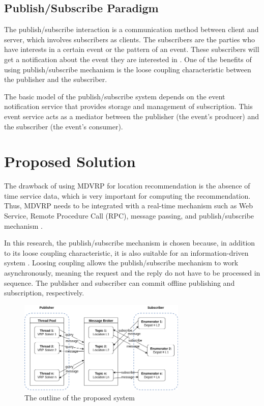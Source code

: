 \documentclass[conference]{IEEEtran}
\begin{document}
\subsection{Publish/Subscribe Paradigm}
\label{ssec:pub-sub}
The publish/subscribe interaction is a communication method between client and server, which involves subscribers as clients. The subscribers are the parties who have interests in a certain event or the pattern of an event. These subscribers will get a notification about the event they are interested in \cite{eugster_many_2003}. One of the benefits of using publish/subscribe mechanism is the loose coupling characteristic \cite{eugster_many_2003} between the publisher and the subscriber.

The basic model of the publish/subscribe system depends on the event notification service that provides storage and management of subscription. This event service acts as a mediator between the publisher (the event's producer) and the subscriber (the event's consumer).


\section{Proposed Solution}
\label{sec:proposed-solution}
The drawback of using MDVRP for location recommendation is the absence of time service data, which is very important for computing the recommendation. Thus, MDVRP needs to be integrated with a real-time mechanism such as Web Service, Remote Procedure Call (RPC), message passing, and publish/subscribe mechanism \cite{eugster_many_2003}.

In this research, the publish/subscribe mechanism is chosen because, in addition to its loose coupling characteristic, it is also suitable for an information-driven system \cite{muhl_large-scale_2002}. Loosing coupling allows the publish/subscribe mechanism to work asynchronously, meaning the request and the reply do not have to be processed in sequence. The publisher and subscriber can commit offline publishing and subscription, respectively. 


\begin{figure}[!]
	\centering
	\includegraphics[width=8cm]{Resources/Images/system-overview}
	\caption{The outline of the proposed system}
	\label{fig:system-overview}
\end{figure}
\end{document}

